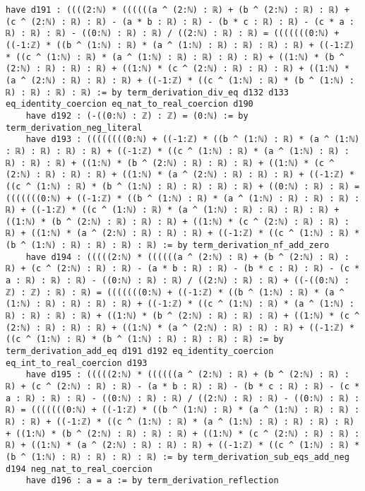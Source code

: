 \documentclass{article}
\begin{document}
\begin{tcolorbox}[colback=white!10, width=\linewidth]
\begin{lstlisting}[language=Lean4]
    have d191 : ((((2:ℕ) * ((((((a ^ (2:ℕ) : ℝ) + (b ^ (2:ℕ) : ℝ) : ℝ) + (c ^ (2:ℕ) : ℝ) : ℝ) - (a * b : ℝ) : ℝ) - (b * c : ℝ) : ℝ) - (c * a : ℝ) : ℝ) : ℝ) - ((0:ℕ) : ℝ) : ℝ) / ((2:ℕ) : ℝ) : ℝ) = (((((((0:ℕ) + ((-1:ℤ) * ((b ^ (1:ℕ) : ℝ) * (a ^ (1:ℕ) : ℝ) : ℝ) : ℝ) : ℝ) + ((-1:ℤ) * ((c ^ (1:ℕ) : ℝ) * (a ^ (1:ℕ) : ℝ) : ℝ) : ℝ) : ℝ) + ((1:ℕ) * (b ^ (2:ℕ) : ℝ) : ℝ) : ℝ) + ((1:ℕ) * (c ^ (2:ℕ) : ℝ) : ℝ) : ℝ) + ((1:ℕ) * (a ^ (2:ℕ) : ℝ) : ℝ) : ℝ) + ((-1:ℤ) * ((c ^ (1:ℕ) : ℝ) * (b ^ (1:ℕ) : ℝ) : ℝ) : ℝ) : ℝ) := by term_derivation_div_eq d132 d133 eq_identity_coercion eq_nat_to_real_coercion d190
    have d192 : (-((0:ℕ) : ℤ) : ℤ) = (0:ℕ) := by term_derivation_neg_literal
    have d193 : ((((((((0:ℕ) + ((-1:ℤ) * ((b ^ (1:ℕ) : ℝ) * (a ^ (1:ℕ) : ℝ) : ℝ) : ℝ) : ℝ) + ((-1:ℤ) * ((c ^ (1:ℕ) : ℝ) * (a ^ (1:ℕ) : ℝ) : ℝ) : ℝ) : ℝ) + ((1:ℕ) * (b ^ (2:ℕ) : ℝ) : ℝ) : ℝ) + ((1:ℕ) * (c ^ (2:ℕ) : ℝ) : ℝ) : ℝ) + ((1:ℕ) * (a ^ (2:ℕ) : ℝ) : ℝ) : ℝ) + ((-1:ℤ) * ((c ^ (1:ℕ) : ℝ) * (b ^ (1:ℕ) : ℝ) : ℝ) : ℝ) : ℝ) + ((0:ℕ) : ℝ) : ℝ) = (((((((0:ℕ) + ((-1:ℤ) * ((b ^ (1:ℕ) : ℝ) * (a ^ (1:ℕ) : ℝ) : ℝ) : ℝ) : ℝ) + ((-1:ℤ) * ((c ^ (1:ℕ) : ℝ) * (a ^ (1:ℕ) : ℝ) : ℝ) : ℝ) : ℝ) + ((1:ℕ) * (b ^ (2:ℕ) : ℝ) : ℝ) : ℝ) + ((1:ℕ) * (c ^ (2:ℕ) : ℝ) : ℝ) : ℝ) + ((1:ℕ) * (a ^ (2:ℕ) : ℝ) : ℝ) : ℝ) + ((-1:ℤ) * ((c ^ (1:ℕ) : ℝ) * (b ^ (1:ℕ) : ℝ) : ℝ) : ℝ) : ℝ) := by term_derivation_nf_add_zero
    have d194 : (((((2:ℕ) * ((((((a ^ (2:ℕ) : ℝ) + (b ^ (2:ℕ) : ℝ) : ℝ) + (c ^ (2:ℕ) : ℝ) : ℝ) - (a * b : ℝ) : ℝ) - (b * c : ℝ) : ℝ) - (c * a : ℝ) : ℝ) : ℝ) - ((0:ℕ) : ℝ) : ℝ) / ((2:ℕ) : ℝ) : ℝ) + ((-((0:ℕ) : ℤ) : ℤ) : ℝ) : ℝ) = (((((((0:ℕ) + ((-1:ℤ) * ((b ^ (1:ℕ) : ℝ) * (a ^ (1:ℕ) : ℝ) : ℝ) : ℝ) : ℝ) + ((-1:ℤ) * ((c ^ (1:ℕ) : ℝ) * (a ^ (1:ℕ) : ℝ) : ℝ) : ℝ) : ℝ) + ((1:ℕ) * (b ^ (2:ℕ) : ℝ) : ℝ) : ℝ) + ((1:ℕ) * (c ^ (2:ℕ) : ℝ) : ℝ) : ℝ) + ((1:ℕ) * (a ^ (2:ℕ) : ℝ) : ℝ) : ℝ) + ((-1:ℤ) * ((c ^ (1:ℕ) : ℝ) * (b ^ (1:ℕ) : ℝ) : ℝ) : ℝ) : ℝ) := by term_derivation_add_eq d191 d192 eq_identity_coercion eq_int_to_real_coercion d193
    have d195 : (((((2:ℕ) * ((((((a ^ (2:ℕ) : ℝ) + (b ^ (2:ℕ) : ℝ) : ℝ) + (c ^ (2:ℕ) : ℝ) : ℝ) - (a * b : ℝ) : ℝ) - (b * c : ℝ) : ℝ) - (c * a : ℝ) : ℝ) : ℝ) - ((0:ℕ) : ℝ) : ℝ) / ((2:ℕ) : ℝ) : ℝ) - ((0:ℕ) : ℝ) : ℝ) = (((((((0:ℕ) + ((-1:ℤ) * ((b ^ (1:ℕ) : ℝ) * (a ^ (1:ℕ) : ℝ) : ℝ) : ℝ) : ℝ) + ((-1:ℤ) * ((c ^ (1:ℕ) : ℝ) * (a ^ (1:ℕ) : ℝ) : ℝ) : ℝ) : ℝ) + ((1:ℕ) * (b ^ (2:ℕ) : ℝ) : ℝ) : ℝ) + ((1:ℕ) * (c ^ (2:ℕ) : ℝ) : ℝ) : ℝ) + ((1:ℕ) * (a ^ (2:ℕ) : ℝ) : ℝ) : ℝ) + ((-1:ℤ) * ((c ^ (1:ℕ) : ℝ) * (b ^ (1:ℕ) : ℝ) : ℝ) : ℝ) : ℝ) := by term_derivation_sub_eqs_add_neg d194 neg_nat_to_real_coercion
    have d196 : a = a := by term_derivation_reflection

\end{lstlisting}
\end{tcolorbox}
\end{document}
